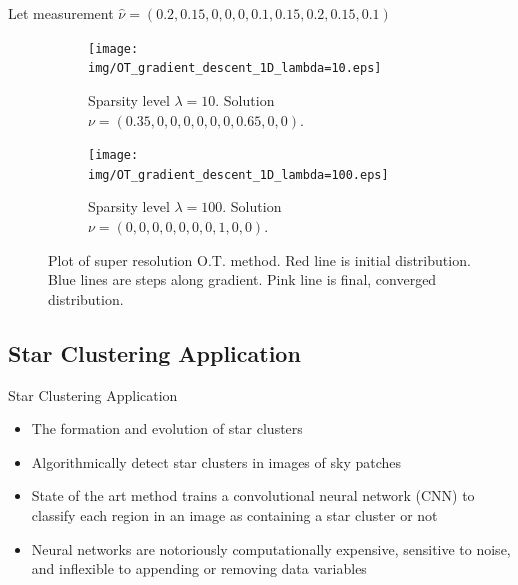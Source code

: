 \documentclass{beamer}
\begin{document}
\begin{frame}{Let measurement $ \hat\nu = (0.2, 0.15, 0, 0, 0, 0.1, 0.15, 0.2, 0.15, 0.1) $ }
\pause
\vspace{-5ex}
\begin{figure}
\centering
\begin{subfigure}[b]{0.45\textwidth}
\centering
\texttt{[image: img/OT\_gradient\_descent\_1D\_lambda=10.eps]}
\caption{Sparsity level $\lambda=10$. Solution $ \nu = (0.35,0,0,0,0,0,0,0.65,0,0)$. }
\label{fig:low_sparse}
\end{subfigure}
\pause
\begin{subfigure}[b]{0.45\textwidth}
\centering
\texttt{[image: img/OT\_gradient\_descent\_1D\_lambda=100.eps]}
\caption{Sparsity level $\lambda=100$. Solution $\nu = (0,0,0,0,0,0,0,1,0,0)$.}
\label{fig:high_sparse}
\end{subfigure}
\caption{Plot of super resolution O.T. method. Red line is initial distribution. Blue lines are steps along gradient. Pink line is final, converged distribution.}
\end{figure}

\end{frame}

\subsection{Star Clustering Application}

\begin{frame}{Star Clustering Application}

\begin{itemize}
    \item The formation and evolution of star clusters \cite{perez_starcnet_2021} \pause
    \item Algorithmically detect star clusters in images of sky patches \pause
    \item State of the art method trains a convolutional neural network (CNN) to classify each region in an image as containing a star cluster or not \cite{perez_starcnet_2021} \pause
    \item Neural networks are notoriously computationally expensive, sensitive to noise, and inflexible to appending or removing data variables
\end{itemize}

\end{frame}
\end{document}
